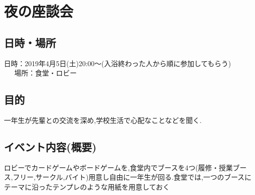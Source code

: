 
\section{夜の座談会}
\subsection{日時・場所}
日時：2019年4月5日(土)20:00〜(入浴終わった人から順に参加してもらう)\\
\ \ \ 場所：食堂・ロビー\\
\subsection{目的}
一年生が先輩との交流を深め,学校生活で心配なことなどを聞く.
\subsection{イベント内容(概要)}
ロビーでカードゲームやボードゲームを,食堂内でブースを4つ(履修・授業ブース,フリー,サークル,バイト)用意し自由に一年生が回る.食堂では,一つのブースに
テーマに沿ったテンプレのような用紙を用意しておく
